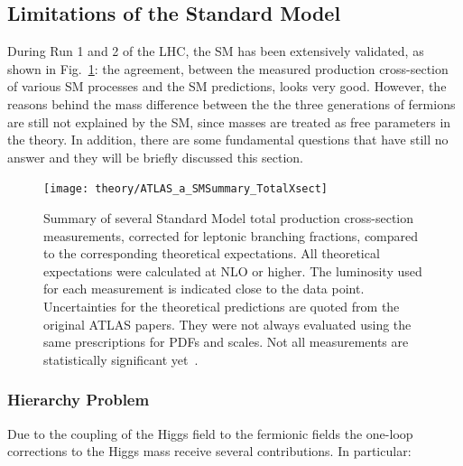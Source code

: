 		\subsection{Limitations of the Standard Model}
		\label{sec:SMlim}

			During Run 1 and 2 of the LHC, the SM has been extensively validated, as shown in Fig.~\ref{fig:ATLAS_a_SMSummary_TotalXsect}: the agreement, between the measured production cross-section of various SM processes and the SM predictions, looks very good. However, the reasons behind the mass difference between the the three generations of fermions are still not explained by the SM, since masses are treated as free parameters in the theory. In addition, there are some fundamental questions that have still no answer and they will be briefly discussed this section.

			\begin{figure}[!htb]
				\centering
				\texttt{[image: theory/ATLAS\_a\_SMSummary\_TotalXsect]}
				\caption{\label{fig:ATLAS_a_SMSummary_TotalXsect} Summary of several Standard Model total production cross-section measurements, corrected for leptonic branching fractions, compared to the corresponding theoretical expectations. All theoretical expectations were calculated at NLO or higher. The luminosity used for each measurement is indicated close to the data point. Uncertainties for the theoretical predictions are quoted from the original ATLAS papers. They were not always evaluated using the same prescriptions for PDFs and scales. Not all measurements are statistically significant yet~\cite{ATLAS_a_SMSummary_TotalXsect}.}
			\end{figure}




		\subsubsection*{Hierarchy Problem}

			Due to the coupling of the Higgs field to the fermionic fields the one-loop corrections to the Higgs mass receive several contributions. In particular: 


